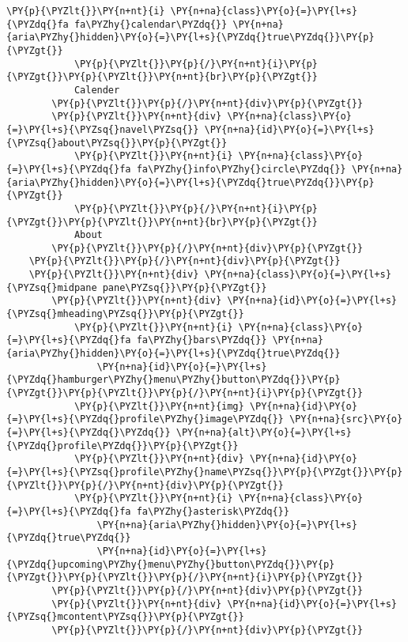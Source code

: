\begin{Verbatim}[commandchars=\\\{\}]
            \PY{p}{\PYZlt{}}\PY{n+nt}{i} \PY{n+na}{class}\PY{o}{=}\PY{l+s}{\PYZdq{}fa fa\PYZhy{}calendar\PYZdq{}} \PY{n+na}{aria\PYZhy{}hidden}\PY{o}{=}\PY{l+s}{\PYZdq{}true\PYZdq{}}\PY{p}{\PYZgt{}}
            \PY{p}{\PYZlt{}}\PY{p}{/}\PY{n+nt}{i}\PY{p}{\PYZgt{}}\PY{p}{\PYZlt{}}\PY{n+nt}{br}\PY{p}{\PYZgt{}}
            Calender
        \PY{p}{\PYZlt{}}\PY{p}{/}\PY{n+nt}{div}\PY{p}{\PYZgt{}}
        \PY{p}{\PYZlt{}}\PY{n+nt}{div} \PY{n+na}{class}\PY{o}{=}\PY{l+s}{\PYZsq{}navel\PYZsq{}} \PY{n+na}{id}\PY{o}{=}\PY{l+s}{\PYZsq{}about\PYZsq{}}\PY{p}{\PYZgt{}}
            \PY{p}{\PYZlt{}}\PY{n+nt}{i} \PY{n+na}{class}\PY{o}{=}\PY{l+s}{\PYZdq{}fa fa\PYZhy{}info\PYZhy{}circle\PYZdq{}} \PY{n+na}{aria\PYZhy{}hidden}\PY{o}{=}\PY{l+s}{\PYZdq{}true\PYZdq{}}\PY{p}{\PYZgt{}}
            \PY{p}{\PYZlt{}}\PY{p}{/}\PY{n+nt}{i}\PY{p}{\PYZgt{}}\PY{p}{\PYZlt{}}\PY{n+nt}{br}\PY{p}{\PYZgt{}}
            About
        \PY{p}{\PYZlt{}}\PY{p}{/}\PY{n+nt}{div}\PY{p}{\PYZgt{}}
    \PY{p}{\PYZlt{}}\PY{p}{/}\PY{n+nt}{div}\PY{p}{\PYZgt{}}
    \PY{p}{\PYZlt{}}\PY{n+nt}{div} \PY{n+na}{class}\PY{o}{=}\PY{l+s}{\PYZsq{}midpane pane\PYZsq{}}\PY{p}{\PYZgt{}}
        \PY{p}{\PYZlt{}}\PY{n+nt}{div} \PY{n+na}{id}\PY{o}{=}\PY{l+s}{\PYZsq{}mheading\PYZsq{}}\PY{p}{\PYZgt{}}
            \PY{p}{\PYZlt{}}\PY{n+nt}{i} \PY{n+na}{class}\PY{o}{=}\PY{l+s}{\PYZdq{}fa fa\PYZhy{}bars\PYZdq{}} \PY{n+na}{aria\PYZhy{}hidden}\PY{o}{=}\PY{l+s}{\PYZdq{}true\PYZdq{}}
                \PY{n+na}{id}\PY{o}{=}\PY{l+s}{\PYZdq{}hamburger\PYZhy{}menu\PYZhy{}button\PYZdq{}}\PY{p}{\PYZgt{}}\PY{p}{\PYZlt{}}\PY{p}{/}\PY{n+nt}{i}\PY{p}{\PYZgt{}}
            \PY{p}{\PYZlt{}}\PY{n+nt}{img} \PY{n+na}{id}\PY{o}{=}\PY{l+s}{\PYZdq{}profile\PYZhy{}image\PYZdq{}} \PY{n+na}{src}\PY{o}{=}\PY{l+s}{\PYZdq{}\PYZdq{}} \PY{n+na}{alt}\PY{o}{=}\PY{l+s}{\PYZdq{}profile\PYZdq{}}\PY{p}{\PYZgt{}}
            \PY{p}{\PYZlt{}}\PY{n+nt}{div} \PY{n+na}{id}\PY{o}{=}\PY{l+s}{\PYZsq{}profile\PYZhy{}name\PYZsq{}}\PY{p}{\PYZgt{}}\PY{p}{\PYZlt{}}\PY{p}{/}\PY{n+nt}{div}\PY{p}{\PYZgt{}}
            \PY{p}{\PYZlt{}}\PY{n+nt}{i} \PY{n+na}{class}\PY{o}{=}\PY{l+s}{\PYZdq{}fa fa\PYZhy{}asterisk\PYZdq{}}
                \PY{n+na}{aria\PYZhy{}hidden}\PY{o}{=}\PY{l+s}{\PYZdq{}true\PYZdq{}}
                \PY{n+na}{id}\PY{o}{=}\PY{l+s}{\PYZdq{}upcoming\PYZhy{}menu\PYZhy{}button\PYZdq{}}\PY{p}{\PYZgt{}}\PY{p}{\PYZlt{}}\PY{p}{/}\PY{n+nt}{i}\PY{p}{\PYZgt{}}
        \PY{p}{\PYZlt{}}\PY{p}{/}\PY{n+nt}{div}\PY{p}{\PYZgt{}}
        \PY{p}{\PYZlt{}}\PY{n+nt}{div} \PY{n+na}{id}\PY{o}{=}\PY{l+s}{\PYZsq{}mcontent\PYZsq{}}\PY{p}{\PYZgt{}}
        \PY{p}{\PYZlt{}}\PY{p}{/}\PY{n+nt}{div}\PY{p}{\PYZgt{}}

\end{Verbatim}
